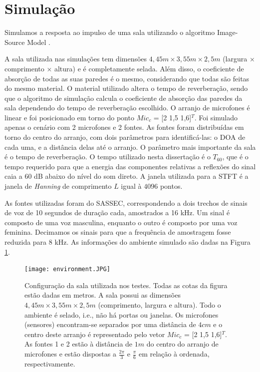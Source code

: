 \label{chap:4}
\section{Simulação}\label{sec:simulation}

Simulamos a resposta ao impulso de uma sala utilizando o algoritmo Image-Source Model \cite{simulation}.

A sala utilizada nas simulações tem dimensões $4,45m \times 3,55m \times 2,5m$ (largura × comprimento × altura) e é completamente selada. Além disso, o coeficiente de absorção de todas as suas paredes é o mesmo, considerando que todas são feitas do mesmo material. O material utilizado altera o tempo de reverberação, sendo que o algoritmo de simulação calcula o coeficiente de absorção das paredes da sala dependendo do tempo de reverberação escolhido. O arranjo de microfones é linear e foi posicionado em torno do ponto $Mic_c$ = [2 1,5 1,6]$^T$. Foi simulado apenas o cenário com 2 microfones e 2 fontes. As fontes foram distribuídas em torno do centro do arranjo, com dois parâmetros para identificá-las: o DOA de cada uma, e a distância delas até o arranjo. O parâmetro mais importante da sala é o tempo de reverberação. O tempo utilizado nesta dissertação é o ${T_{60}}$, que é o tempo requerido para que a energia das componentes relativas a reflexões do sinal caia a 60 dB abaixo do nível do som direto. A janela utilizada para a STFT é a janela de \textit{Hanning} de comprimento $L$ igual à $4096$ pontos.

As fontes utilizadas foram do SASSEC, correspondendo a dois trechos de sinais de voz de 10 segundos de duração cada, amostrados a 16 kHz. Um sinal é composto de uma voz masculina, enquanto o outro é composto por uma voz feminina. Decimamos os sinais para que a frequência de amostragem fosse reduzida para 8 kHz. As informações do ambiente simulado são dadas na Figura \ref{fig:environment}.

\begin{figure}
    \centering
    \texttt{[image: environment.JPG]}
    \caption{Configuração da sala utilizada nos testes. Todas as cotas da figura estão dadas em metros. A sala possui as dimensões $4,45m \times 3,55m \times 2,5m$ (comprimento, largura e altura). Todo o ambiente é selado, i.e., não há portas ou janelas. Os microfones (sensores) encontram-se separados por uma distância de $4cm$ e o centro deste arranjo é representado pelo vetor $Mic_c$ = [2 1,5 1,6]$^T$. As fontes 1 e 2 estão à distância de $1m$ do centro do arranjo de microfones e estão dispostas a $\frac{2\pi}{3}$ e $\frac{\pi}{6}$ em relação à ordenada, respectivamente.}
    \label{fig:environment}
\end{figure}


